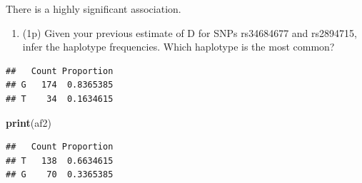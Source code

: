\documentclass[
]{article}
\newenvironment{Shaded}{\begin{snugshade}}{\end{snugshade}}
\newcommand{\FunctionTok}[1]{\textcolor[rgb]{0.13,0.29,0.53}{\textbf{#1}}}
\newcommand{\NormalTok}[1]{#1}
\newcommand{\OtherTok}[1]{\textcolor[rgb]{0.56,0.35,0.01}{#1}}
\newcommand{\SpecialCharTok}[1]{\textcolor[rgb]{0.81,0.36,0.00}{\textbf{#1}}}
\providecommand{\tightlist}{%
  \setlength{\itemsep}{0pt}\setlength{\parskip}{0pt}}
\begin{document}
There is a highly significant association.

\begin{enumerate}
\def\labelenumi{\arabic{enumi}.}
\setcounter{enumi}{2}
\tightlist
\item
  (1p) Given your previous estimate of D for SNPs rs34684677 and
  rs2894715, infer the haplotype frequencies. Which haplotype is the
  most common?
\end{enumerate}

\begin{Shaded}
\end{Shaded}

\begin{verbatim}
##   Count Proportion
## G   174  0.8365385
## T    34  0.1634615
\end{verbatim}

\begin{Shaded}
\begin{Highlighting}[]
\FunctionTok{print}\NormalTok{(af2)}
\end{Highlighting}
\end{Shaded}

\begin{verbatim}
##   Count Proportion
## T   138  0.6634615
## G    70  0.3365385
\end{verbatim}
\end{document}
